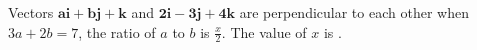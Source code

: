 \item Vectors $\mathbf{ai} + \mathbf{bj} + \mathbf{k}$ and $\mathbf{2i} - \mathbf{3j} + \mathbf{4k}$ are perpendicular to each other when $3a + 2b = 7$, the ratio of $a$ to $b$ is $\frac{x}{2}$. The value of $x$ is \underline{\hspace{2.5cm}}.